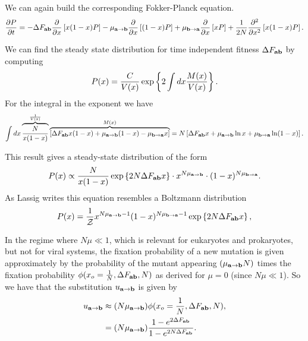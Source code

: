 We can again build the corresponding Fokker-Planck equation.
\begin{equation}
  {\partial P \over \partial t} =
  - \Delta F_{\mathbf{ab}} {\partial \over \partial x} \left[ x (1 - x) P \right] -
  \mu_{\mathbf{a} \rightarrow \mathbf{b}} {\partial \over \partial x} \left[ (1 - x) P \right] +
  \mu_{\mathbf{b} \rightarrow \mathbf{a}} {\partial \over \partial x} \left[ x P \right] +
  {1 \over 2N} {\partial^2 \over \partial x^2} \left[ x (1 - x) P \right].
\end{equation}

We can find the steady state distribution for time independent fitness $\Delta F_{\mathbf{ab}}$ by
computing
\begin{equation}
  P(x) = {C \over V(x)} \exp\left\{ 2 \int dx {M(x) \over V(x)} \right\}.
\end{equation}
For the integral in the exponent we have
\begin{equation}
  \int dx \overbrace{{N \over x (1 - x)}}^{1 \over V(x)}
  \overbrace{\left[ \Delta F_{\mathbf{ab}} x ( 1 - x) + \mu_{\mathbf{a} \rightarrow \mathbf{b}} (1 - x) - \mu_{\mathbf{b} \rightarrow \mathbf{a}} x \right]}^
  {M(x)} =
  N \left[ \Delta F_{\mathbf{ab}} x + \mu_{\mathbf{a} \rightarrow \mathbf{b}} \ln x + \mu_{\mathbf{b} \rightarrow \mathbf{a}} \ln (1 - x) \right].
\end{equation}

This result gives a steady-state distribution of the form
\begin{equation}
  P(x) \propto {N \over x (1 - x)} \exp\left\{ 2 N \Delta F_{\mathbf{ab}} x \right\}
  \cdot x^{N \mu_{\mathbf{a} \rightarrow \mathbf{b}}} \cdot (1 - x)^{N \mu_{\mathbf{b} \rightarrow \mathbf{a}}}.
\end{equation}
As Lassig writes this equation resembles a Boltzmann distribution
\begin{equation}
  P(x) = {1 \over \mathcal{Z}} x^{N \mu_{\mathbf{a} \rightarrow \mathbf{b}} - 1} (1 - x)^{N \mu_{\mathbf{b} \rightarrow \mathbf{a}} - 1}
  \exp \left\{ 2 N \Delta F_{\mathbf{ab}} x \right\},
\end{equation}

In the regime where $N \mu \ll 1$, which is relevant for eukaryotes and
prokaryotes, but not for viral systems, the fixation probability of a new
mutation is given approximately by the probability of the mutant appearing
$(\mu_{\mathbf{a} \rightarrow \mathbf{b}} N)$ times the fixation probability $\phi(x_o = {1 \over N}, \Delta F_{\mathbf{ab}}, N)$
as derived for $\mu = 0$ (since $N \mu \ll 1$). So we have that the substitution
$u_{\mathbf{a} \rightarrow \mathbf{b}}$ is given by
\begin{align}
  u_{\mathbf{a} \rightarrow \mathbf{b}} &\approx (N \mu_{\mathbf{a} \rightarrow \mathbf{b}}) \phi(x_o = {1 \over N}, \Delta F_{\mathbf{ab}}, N),\\
  &= (N \mu_{\mathbf{a} \rightarrow \mathbf{b}}) {1 - e^{2 \Delta F_{\mathbf{ab}}} \over 1 - e^{2N \Delta F_{\mathbf{ab}}}}.
\end{align}

